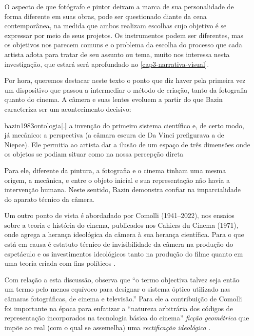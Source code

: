 O aspecto de que fotógrafo e pintor deixam a marca de sua personalidade
de forma diferente em suas obras, pode ser questionado diante da cena
contemporânea, na medida que ambos realizam escolhas cujo objetivo é se
expressar por meio de seus projetos. Os instrumentos podem ser
diferentes, mas os objetivos nos parecem comuns e o problema da escolha
do processo que cada artista adota para tratar de seu assunto ou tema,
muito nos interessa nesta investigaçāo, que estará será aprofundado no
\cref{cap3-narrativa-visual}. 

\pagebreak

Por hora, queremos destacar neste texto o ponto que diz haver pela
primeira vez um dispositivo que passou a intermediar o método de
criação, tanto da fotografia quanto do cinema. A câmera e suas lentes
evoluem a partir do que Bazin caracteriza ser um acontecimento
decisivo:


\begin{displaycquote}[125]{bazin1983ontologia}[.]
	\textelp{} a invenção do primeiro sistema científico e, de certo modo, já
	mecânico: a perspectiva (a câmara escura de Da Vinci prefigurava a de
	Niepce). Ele permitia ao artista dar a ilusão de um espaço de três
	dimensões onde os objetos se podiam situar como na nossa percepção
	direta
\end{displaycquote}

Para ele, diferente da pintura, a fotografia e o cinema tinham uma
mesma origem, a mecânica, e entre o objeto inicial e sua representação
não havia a intervenção humana. Neste sentido, Bazin demonstra confiar
na imparcialidade do aparato técnico da câmera.

Um outro ponto de vista é abordadado por Comolli (1941--2022), nos
ensaios sobre a teoria e história do cinema, publicados nos Cahiers du
Cinema (1971), onde agrega a herança ideológica da câmera à sua herança
científica. Para \textcite{comolli2015cinema} o que está em causa é estatuto técnico
de invisibilidade da câmera na produção do espetáculo e os
investimentos ideológicos tanto na produção do filme quanto em uma
teoria criada com fins políticos \parencite{comolli2015cinema}.

Com relação a esta discussão, \textcite{grilo1993ordem}
observa que \enquote{o termo objectiva talvez seja então um termo pelo
	menos equívoco para designar o sistema óptico utilizado nas câmaras
	fotográficas, de cinema e televisão.} Para ele a contribuição de
Comolli foi importante na época para enfatizar a \enquote{natureza
	arbitrária dos códigos de representação incorporados na tecnologia
	básica do cinema} \textelp{} \emph{ficção geométrica} que impõe ao real
(com o qual se assemelha) uma \emph{rectificação ideológica}
\parencite[332-333]{grilo1993ordem}.


